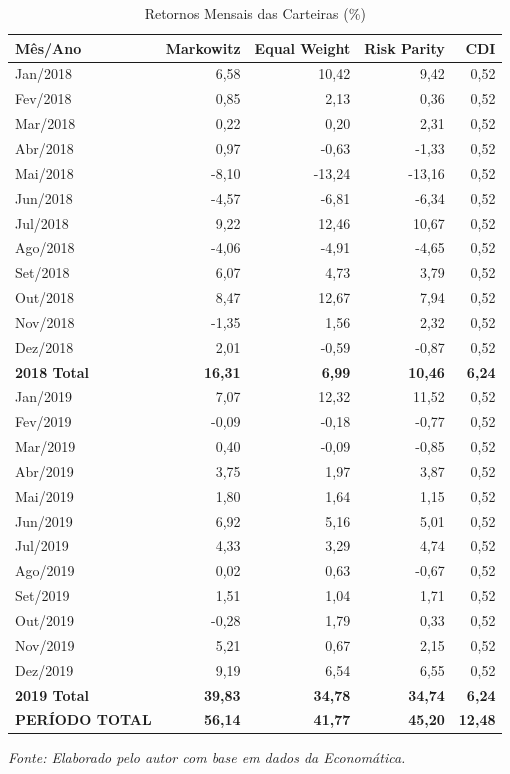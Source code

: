 \begin{table}[H]
\centering
\caption{Retornos Mensais das Carteiras (\%)}
\begin{tabular}{|l|r|r|r|r|}
\hline
\textbf{Mês/Ano} & \textbf{Markowitz} & \textbf{Equal Weight} & \textbf{Risk Parity} & \textbf{CDI} \\
\hline
Jan/2018 & 6,58 & 10,42 & 9,42 & 0,52 \\
Fev/2018 & 0,85 & 2,13 & 0,36 & 0,52 \\
Mar/2018 & 0,22 & 0,20 & 2,31 & 0,52 \\
Abr/2018 & 0,97 & -0,63 & -1,33 & 0,52 \\
Mai/2018 & -8,10 & -13,24 & -13,16 & 0,52 \\
Jun/2018 & -4,57 & -6,81 & -6,34 & 0,52 \\
Jul/2018 & 9,22 & 12,46 & 10,67 & 0,52 \\
Ago/2018 & -4,06 & -4,91 & -4,65 & 0,52 \\
Set/2018 & 6,07 & 4,73 & 3,79 & 0,52 \\
Out/2018 & 8,47 & 12,67 & 7,94 & 0,52 \\
Nov/2018 & -1,35 & 1,56 & 2,32 & 0,52 \\
Dez/2018 & 2,01 & -0,59 & -0,87 & 0,52 \\
\hline
\textbf{2018 Total} & \textbf{16,31} & \textbf{6,99} & \textbf{10,46} & \textbf{6,24} \\
\hline
Jan/2019 & 7,07 & 12,32 & 11,52 & 0,52 \\
Fev/2019 & -0,09 & -0,18 & -0,77 & 0,52 \\
Mar/2019 & 0,40 & -0,09 & -0,85 & 0,52 \\
Abr/2019 & 3,75 & 1,97 & 3,87 & 0,52 \\
Mai/2019 & 1,80 & 1,64 & 1,15 & 0,52 \\
Jun/2019 & 6,92 & 5,16 & 5,01 & 0,52 \\
Jul/2019 & 4,33 & 3,29 & 4,74 & 0,52 \\
Ago/2019 & 0,02 & 0,63 & -0,67 & 0,52 \\
Set/2019 & 1,51 & 1,04 & 1,71 & 0,52 \\
Out/2019 & -0,28 & 1,79 & 0,33 & 0,52 \\
Nov/2019 & 5,21 & 0,67 & 2,15 & 0,52 \\
Dez/2019 & 9,19 & 6,54 & 6,55 & 0,52 \\
\hline
\textbf{2019 Total} & \textbf{39,83} & \textbf{34,78} & \textbf{34,74} & \textbf{6,24} \\
\hline
\textbf{PERÍODO TOTAL} & \textbf{56,14} & \textbf{41,77} & \textbf{45,20} & \textbf{12,48} \\
\hline
\end{tabular}
\textit{Fonte: Elaborado pelo autor com base em dados da Economática.}
\label{tab:monthly_returns}
\end{table}

